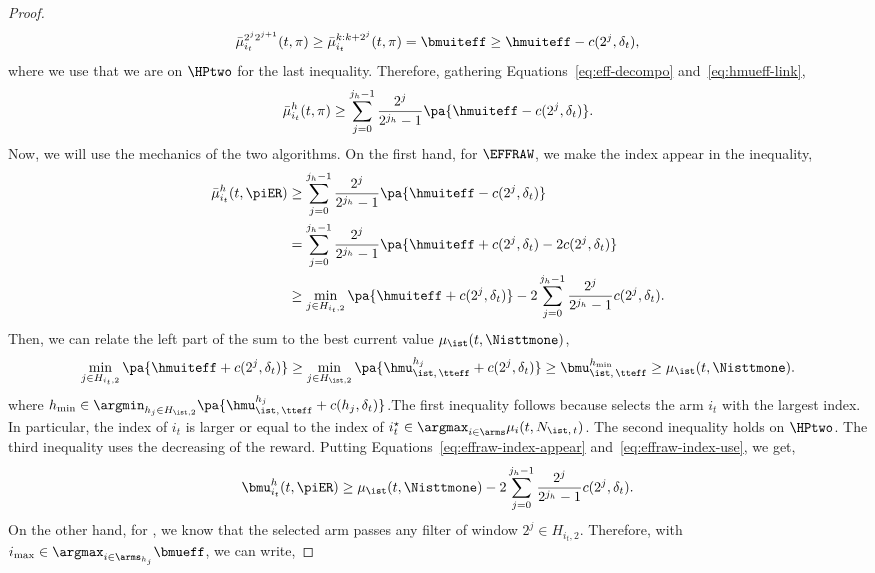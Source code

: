 \begin{proof}
\begin{equation}
\label{eq:hmueff-link}
\bar{\mu}^{2^{j}2^{j+1}}_{i_t}(t, \pi) \geq \bar{\mu}^{k : k+2^{j}}_{i_t}(t, \pi) = \bmuiteff\geq  \hmuiteff - c(2^j, \delta_t),
\end{equation}
where we use that we are on $\HPtwo$ for the last inequality. Therefore, gathering Equations~\ref{eq:eff-decompo} and~\ref{eq:hmueff-link}, 
\begin{equation}
\label{eq:eff-general}
\bar{\mu}^{h}_{i_t}(t, \pi) \geq \sum_{j=0}^{j_h-1} \frac{2^j}{2^{j_h}-1} \pa{\hmuiteff - c(2^j, \delta_t)}.
\end{equation}
Now, we will use the mechanics of the two algorithms. On the first hand, for $\EFFRAW$, we make the index appear in the inequality,
\begin{align}
 \bar{\mu}^{h}_{i_t}(t, \piER) &\geq \sum_{j=0}^{j_h-1} \frac{2^j}{2^{j_h}-1} \pa{\hmuiteff - c(2^j, \delta_t)} \nonumber\\
 &=\sum_{j=0}^{j_h-1} \frac{2^j}{2^{j_h}-1} \pa{\hmuiteff + c(2^j, \delta_t) - 2c(2^j, \delta_t)}\nonumber\\
 &\geq \min_{j \in H_{i_t, 2}} \pa{\hmuiteff + c(2^j, \delta_t)} - 2 \sum_{j=0}^{j_h-1} \frac{2^{j}}{2^{j_h}-1} c(2^j, \delta_t).
 \label{eq:effraw-index-appear}
 \end{align}
 Then, we can relate the left part of the sum to the best current value $\mu_{\ist}(t,\Nisttmone)$,
 \begin{equation}
 \min_{j \in H_{i_t, 2}}  \pa{\hmuiteff + c(2^j, \delta_t)} \geq \min_{j \in H_{\ist,2}} \pa{\hmu_{\ist,\, \tteff}^{h_j} + c(2^j, \delta_t)}\geq  \bmu_{\ist,\, \tteff}^{h_{\min}} \geq \mu_{\ist}(t,\Nisttmone).
 \label{eq:effraw-index-use}
 \end{equation}
%
where $h_{\min} \in \argmin_{h_j \in H_{\ist,2}} \pa{\hmu^{h_j}_{\ist,\, \tteff} + c(h_j, \delta_t)}$.The first inequality follows because \EFFRAW selects the arm $i_t$ with the largest index. In particular, the index of $i_t$ is larger or equal to the index of $i^\star_t \in \argmax_{i\in \arms} \mu_i(t, N_{\ist,\,t})$. The second inequality holds on $\HPtwo$. The third inequality uses the decreasing of the reward. Putting Equations~\ref{eq:effraw-index-appear} and~\ref{eq:effraw-index-use}, we get,
\begin{equation}
\label{eq:effraw-result}
\bmu^{h}_{i_t}(t, \piER) \geq \mu_{\ist}(t,\Nisttmone)- 2 \sum_{j=0}^{j_h-1} \frac{2^{j}}{2^{j_h}-1} c(2^j, \delta_t).
\end{equation}
%
On the other hand, for \EFFFEWA, we know that the selected arm passes any filter of window $2^j \in H_{i_t, 2}$. Therefore, with $i_{\max} \in \argmax_{i \in \arms_{h_j}} \bmueff$, we can write,

\end{proof}
